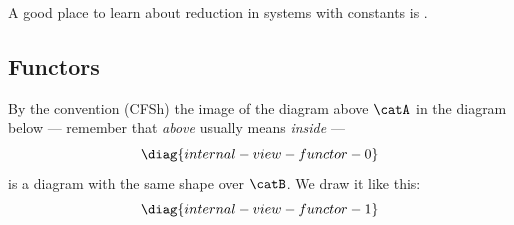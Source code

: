 \documentclass[oneside,12pt]{article}
\begin{document}
A good place to learn about reduction in systems with constants is
\cite{SICP}.







%                                          
\subsection{Functors \DONE}
\label{internal-view-functor}



By the convention (CFSh) the image of the diagram above $\catA$ in the
diagram below --- remember that {\sl above} usually means {\sl inside}
---
%
$$\pu
  \diag{internal-view-functor-0}
$$
%
is a diagram with the same shape over $\catB$. We draw it like this:
%
$$\pu
  \diag{internal-view-functor-1}
$$
\end{document}
